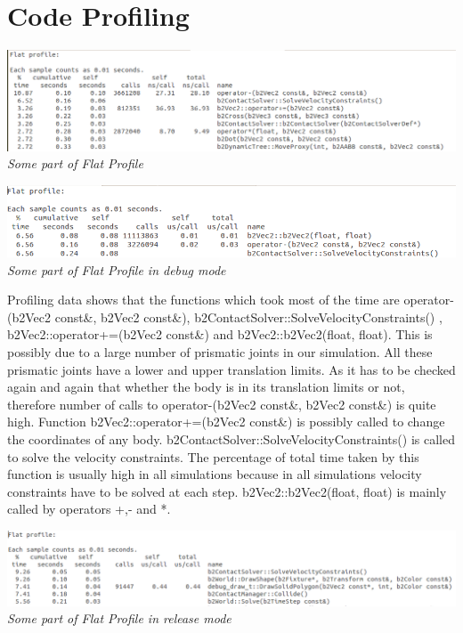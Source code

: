 \documentclass[11pt]{article}
\begin{document}
\section{Code Profiling}
\begin{center}
 \includegraphics[scale=0.5]{images/prof1}
 \it Some part of Flat Profile
 \end{center}
  \begin{center}
 \includegraphics[scale=0.5]{images/debprof1}
 \it \\ Some part of Flat Profile in debug mode
 \end{center}
 Profiling data shows that the functions which took most of the time are \textsf{operator-(b2Vec2 const\&, b2Vec2 const\&)}, \textsf{b2ContactSolver::SolveVelocityConstraints()}
 , \textsf{b2Vec2::operator+=(b2Vec2 const\&)} and \textsf{b2Vec2::b2Vec2(float, float)}. This is possibly due to a large number of prismatic joints in our simulation. All these prismatic joints have a lower and upper 
 translation limits. As it has to be checked again and again that whether the body is in its translation limits or not, therefore number of calls to \textsf{operator-(b2Vec2 const\&, b2Vec2 const\&)} 
 is quite high. Function \textsf{b2Vec2::operator+=(b2Vec2 const\&)} is possibly called to change the coordinates of any body. \textsf{b2ContactSolver::SolveVelocityConstraints()} is called
 to solve the velocity constraints. The percentage of total time taken by this function is  usually high in all simulations because in all simulations velocity constraints have to be
 solved at each step. \textsf{b2Vec2::b2Vec2(float, float)} is mainly called by operators +,- and *. 
  \begin{center}
 \includegraphics[scale=0.5]{images/relprof1}
 \it Some part of Flat Profile in release mode
 \end{center}
 
\end{document}
